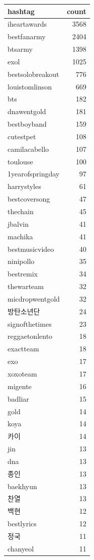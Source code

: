 \begin{tabular}{lr}
\toprule
hashtag & count \\
\midrule
iheartawards & 3568 \\
bestfanarmy & 2404 \\
btsarmy & 1398 \\
exol & 1025 \\
bestsolobreakout & 776 \\
louistomlinson & 669 \\
bts & 182 \\
dnawentgold & 181 \\
bestboyband & 159 \\
cutestpet & 108 \\
camilacabello & 107 \\
toulouse & 100 \\
1yearofspringday & 97 \\
harrystyles & 61 \\
bestcoversong & 47 \\
thechain & 45 \\
jbalvin & 41 \\
machika & 41 \\
bestmusicvideo & 40 \\
ninipollo & 35 \\
bestremix & 34 \\
thewarteam & 32 \\
micdropwentgold & 32 \\
방탄소년단 & 24 \\
signofthetimes & 23 \\
reggaetonlento & 18 \\
exactteam & 18 \\
exo & 17 \\
xoxoteam & 17 \\
migente & 16 \\
badliar & 15 \\
gold & 14 \\
koya & 14 \\
카이 & 14 \\
jin & 13 \\
dna & 13 \\
종인 & 13 \\
baekhyun & 13 \\
찬열 & 13 \\
백현 & 12 \\
bestlyrics & 12 \\
정국 & 11 \\
chanyeol & 11 \\

\end{tabular}
